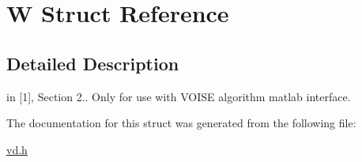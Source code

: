 \hypertarget{structW}{}\section{W Struct Reference}
\label{structW}


\subsection{Detailed Description}
in \mbox{[}1\mbox{]}, Section 2.. Only for use with V\+O\+I\+SE algorithm matlab interface. 

The documentation for this struct was generated from the following file\+:\begin{DoxyCompactItemize}
\item 
\mbox{\hyperlink{vd_8h}{vd.\+h}}\end{DoxyCompactItemize}
